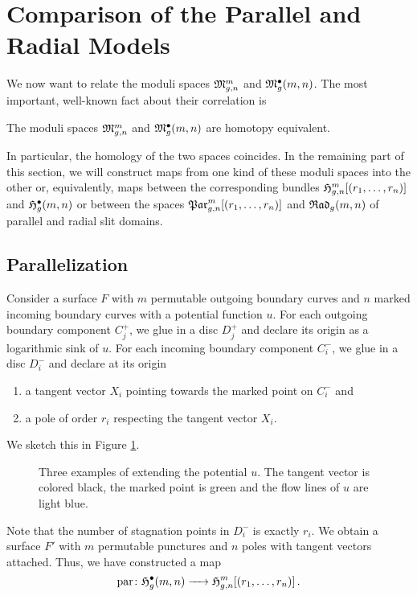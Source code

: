 \section{Comparison of the Parallel and Radial Models}

We now want to relate the moduli spaces $\mathfrak{M}^m_{g,n}$ and $\mathfrak{M}^\bullet_g(m, n)$.
The most important, well-known fact about their correlation is

\begin{prop}
    \label{cellular_models:comparision_of_the_models:bundles_are_h_equiv}
    The moduli spaces $\mathfrak{M}^m_{g,n}$ and $\mathfrak{M}^\bullet_g(m, n)$ are homotopy equivalent.
\end{prop}

In particular, the homology of the two spaces coincides.
In the remaining part of this section, we will construct maps from one kind of these moduli spaces into the other
or, equivalently, maps between the corresponding bundles $\mathfrak{H}^m_{g,n}[(r_1, \dotsc, r_n)]$ and $\mathfrak{H}^{\bullet}_g(m, n)$ or between the spaces $\mathfrak{Par}_{g, n}^m[(r_1, \dotsc, r_n)]$ and ${\mathfrak{Rad}_g(m,n)}$ of parallel and radial slit domains.

\subsection{Parallelization}
\label{cellular_parallelization}

Consider a surface $F$ with $m$ permutable outgoing boundary curves and $n$ marked incoming boundary curves with a potential function $u$.
For each outgoing boundary component $C^+_j$, we glue in a disc $D^+_j$ and declare its origin as a logarithmic sink of $u$.
For each incoming boundary component $C^-_i$, we glue in a disc $D^-_i$ and declare at its origin
\begin{enumerate}
    \item a tangent vector $X_i$ pointing towards the marked point on $C^-_i$ and
    \item a pole of order $r_i$ respecting the tangent vector $X_i$.
\end{enumerate}
We sketch this in Figure \ref{cellular_models:comparision_of_the_models:glueing_caps}.
\begin{figure}[ht]
    \centering
    \def\svgwidth{\columnwidth}
    
    \caption{\label{cellular_models:comparision_of_the_models:glueing_caps}{Three examples of extending the potential $u$.
        The tangent vector is colored black, the marked point is green and the flow lines of $u$ are light blue.}}
\end{figure}
Note that the number of stagnation points in $D^-_i$ is exactly $r_i$.
We obtain a surface $F'$ with $m$ permutable punctures and $n$ poles with tangent vectors attached.
Thus, we have constructed a map
\[
 \parmap \colon \HarmRad \to \Harmr\,.
\]


